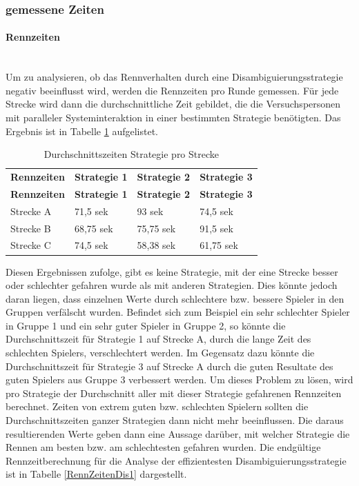 \documentclass[12pt,a4paper]{scrartcl}
\begin{document}
\subsubsection{gemessene Zeiten}
\label{messwerte}
\paragraph{Rennzeiten} 
~\\
Um zu analysieren, ob das Rennverhalten durch eine Disambiguierungsstrategie negativ beeinflusst wird, werden die Rennzeiten pro Runde gemessen. Für jede Strecke wird dann die durchschnittliche Zeit gebildet, die die Versuchspersonen mit paralleler Systeminteraktion in einer bestimmten Strategie benötigten. Das Ergebnis ist in Tabelle \ref{RZ3SV1} aufgelistet.

\begin{longtable}{p{3cm}p{3cm}p{3cm}p{3cm} }
	\label{RZ3SV1}\\
	\caption[Durchschnittszeiten Strategie pro Strecke]{Durchschnittszeiten Strategie pro Strecke}\\
	\hline
	\textbf{Rennzeiten}&\textbf{Strategie 1}&\textbf{Strategie 2} &\textbf{Strategie 3}\\
	\hline
	\endfirsthead
	\hline
	\textbf{Rennzeiten}&\textbf{Strategie 1}&\textbf{Strategie 2} &\textbf{Strategie 3}\\
	\hline
	\endhead
Strecke A & 71,5 sek & 93 sek & 74,5 sek \\
Strecke B & 68,75 sek & 75,75 sek & 91,5 sek \\
Strecke C & 74,5 sek & 58,38 sek & 61,75 sek \\
\hline
\end{longtable}

Diesen Ergebnissen zufolge, gibt es keine Strategie, mit der eine Strecke besser oder schlechter gefahren wurde als mit anderen Strategien. 
Dies könnte jedoch daran liegen, dass einzelnen Werte durch schlechtere bzw. bessere Spieler in den Gruppen verfälscht wurden.
Befindet sich zum Beispiel ein sehr schlechter Spieler in Gruppe 1 und ein sehr guter Spieler in Gruppe 2, so könnte die Durchschnittszeit für Strategie 1 auf Strecke A, durch die lange Zeit des schlechten Spielers, verschlechtert werden. Im Gegensatz dazu könnte die Durchschnittszeit für Strategie 3 auf Strecke A durch die guten Resultate des guten Spielers aus Gruppe 3 verbessert werden. Um dieses Problem zu lösen, wird pro Strategie der Durchschnitt aller mit dieser Strategie gefahrenen Rennzeiten berechnet. Zeiten von extrem guten bzw. schlechten Spielern sollten die Durchschnittszeiten ganzer Strategien dann nicht mehr beeinflussen. Die daraus resultierenden Werte geben dann eine Aussage darüber, mit welcher Strategie die Rennen am besten bzw. am schlechtesten gefahren wurden. 
Die endgültige Rennzeitberechnung für die Analyse der effizientesten Disambiguierungsstrategie ist in Tabelle \ref{RennZeitenDis1} dargestellt.
\end{document}
